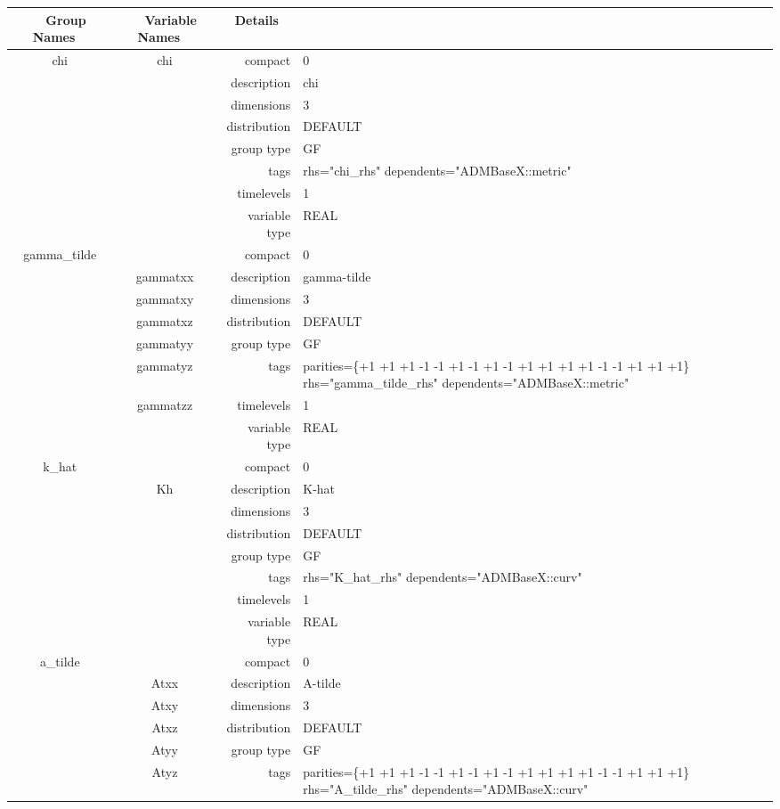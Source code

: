 \begin{tabular*}{150mm}{|c|c@{\extracolsep{\fill}}|rl|} \hline 
~ {\bf Group Names} ~ & ~ {\bf Variable Names} ~  &{\bf Details} ~ & ~\\ 
\hline 
chi & chi & compact & 0 \\ 
 &  & description & chi \\ 
 &  & dimensions & 3 \\ 
 &  & distribution & DEFAULT \\ 
 &  & group type & GF \\ 
 &  & tags & rhs="chi\_rhs" dependents="ADMBaseX::metric" \\ 
 &  & timelevels & 1 \\ 
 &  & variable type & REAL \\ 
\hline 
gamma\_tilde &  & compact & 0 \\ 
 & gammatxx & description & gamma-tilde \\ 
 & gammatxy & dimensions & 3 \\ 
 & gammatxz & distribution & DEFAULT \\ 
 & gammatyy & group type & GF \\ 
 & gammatyz & tags & parities=\{+1 +1 +1   -1 -1 +1   -1 +1 -1   +1 +1 +1   +1 -1 -1   +1 +1 +1\} rhs="gamma\_tilde\_rhs" dependents="ADMBaseX::metric" \\ 
 & gammatzz & timelevels & 1 \\ 
 &  & variable type & REAL \\ 
\hline 
k\_hat &  & compact & 0 \\ 
 & Kh & description & K-hat \\ 
 &  & dimensions & 3 \\ 
 &  & distribution & DEFAULT \\ 
 &  & group type & GF \\ 
 &  & tags & rhs="K\_hat\_rhs" dependents="ADMBaseX::curv" \\ 
 &  & timelevels & 1 \\ 
 &  & variable type & REAL \\ 
\hline 
a\_tilde &  & compact & 0 \\ 
 & Atxx & description & A-tilde \\ 
 & Atxy & dimensions & 3 \\ 
 & Atxz & distribution & DEFAULT \\ 
 & Atyy & group type & GF \\ 
 & Atyz & tags & parities=\{+1 +1 +1   -1 -1 +1   -1 +1 -1   +1 +1 +1   +1 -1 -1   +1 +1 +1\} rhs="A\_tilde\_rhs" dependents="ADMBaseX::curv" \\ 

\end{tabular*}

